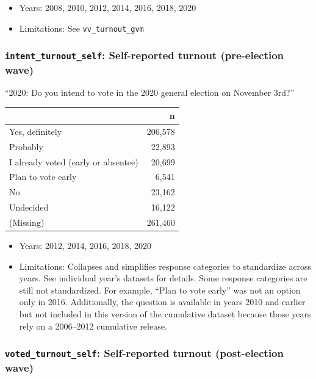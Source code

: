 \documentclass[10pt,article,oneside]{memoir}
\theoremstyle{definition}
\begin{document}
\begin{itemize}
\tightlist
\item
  Years: 2008, 2010, 2012, 2014, 2016, 2018, 2020
\item
  Limitations: See \texttt{vv\_turnout\_gvm}
\end{itemize}

\hypertarget{intent_turnout_self-self-reported-turnout-pre-election-wave}{%
\subsubsection{\texorpdfstring{\texttt{intent\_turnout\_self}:
Self-reported turnout (pre-election
wave)}{intent\_turnout\_self: Self-reported turnout (pre-election wave)}}\label{intent_turnout_self-self-reported-turnout-pre-election-wave}}

``2020: Do you intend to vote in the 2020 general election on November
3rd?''

\begin{table}[H]
\centering
\begin{tabular}[t]{lr}
\toprule
 & n\\
\midrule
Yes, definitely & 206,578\\
Probably & 22,893\\
I already voted (early or absentee) & 20,699\\
Plan to vote early & 6,541\\
No & 23,162\\
Undecided & 16,122\\
(Missing) & 261,460\\
\bottomrule
\end{tabular}
\end{table}

\begin{itemize}
\tightlist
\item
  Years: 2012, 2014, 2016, 2018, 2020
\item
  Limitations: Collapses and simplifies response categories to
  standardize across years. See individual year's datasets for details.
  Some response categories are still not standardized. For example,
  ``Plan to vote early'' was not an option only in 2016. Additionally,
  the question is available in years 2010 and earlier but not included
  in this version of the cumulative dataset because those years rely on
  a 2006--2012 cumulative release.
\end{itemize}

\hypertarget{voted_turnout_self-self-reported-turnout-post-election-wave}{%
\subsubsection{\texorpdfstring{\texttt{voted\_turnout\_self}:
Self-reported turnout (post-election
wave)}{voted\_turnout\_self: Self-reported turnout (post-election wave)}}\label{voted_turnout_self-self-reported-turnout-post-election-wave}}
\end{document}
